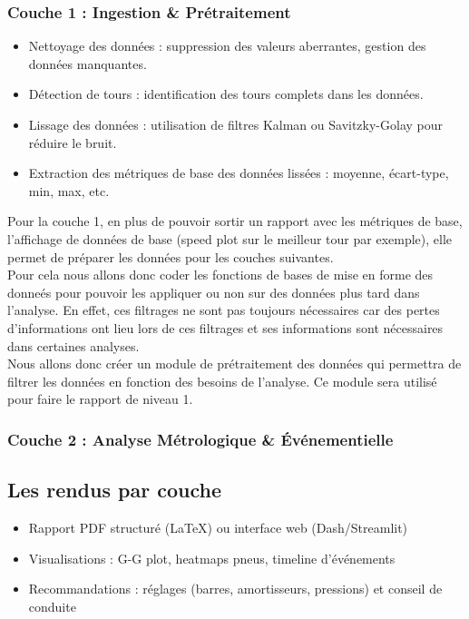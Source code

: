\documentclass[a4paper,12pt]{report}
\begin{document}
\subsubsection{Couche 1 : Ingestion \& Prétraitement}
\begin{itemize}
    \item Nettoyage des données : suppression des valeurs aberrantes, gestion des données manquantes.
    \item Détection de tours : identification des tours complets dans les données.
    \item Lissage des données : utilisation de filtres Kalman ou Savitzky-Golay pour réduire le bruit.
    \item Extraction des métriques de base des données lissées : moyenne, écart-type, min, max, etc.
\end{itemize}

Pour la couche 1, en plus de pouvoir sortir un rapport avec les métriques de base, l'affichage de données de base (speed plot sur le meilleur tour par exemple), elle permet de préparer les données pour les couches suivantes.\\

Pour cela nous allons donc coder les fonctions de bases de mise en forme des donneés pour pouvoir les appliquer ou non sur des données plus tard dans l'analyse.
En effet, ces filtrages ne sont pas toujours nécessaires car des pertes d'informations ont lieu lors de ces filtrages et ses informations sont nécessaires dans certaines analyses.\\

Nous allons donc créer un module de prétraitement des données qui permettra de filtrer les données en fonction des besoins de l'analyse. Ce module sera utilisé pour faire le rapport de niveau 1.


\subsubsection{Couche 2 : Analyse Métrologique \& Événementielle}
\subsection{Les rendus par couche}

\begin{itemize}
    \item Rapport PDF structuré (LaTeX) ou interface web (Dash/Streamlit)
    \item Visualisations : G-G plot, heatmaps pneus, timeline d’événements
    \item Recommandations : réglages (barres, amortisseurs, pressions) et conseil de conduite
\end{itemize}
\end{document}
